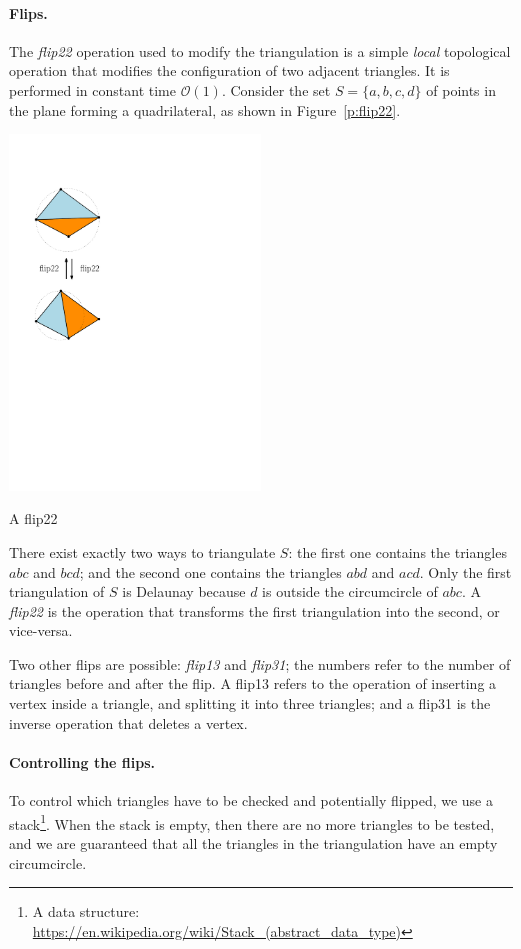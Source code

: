\paragraph{Flips.}
The \emph{flip22} operation used to modify the triangulation is a simple \emph{local} topological operation that modifies the configuration of two adjacent triangles. 
It is performed in constant time $\mathcal{O}(1)$.
Consider the set $S = \{a, b, c, d\}$ of points in the plane forming a quadrilateral, as shown in Figure~\ref{p:flip22}. 
\begin{marginfigure}
  \centering
  \includegraphics[width=0.5\textwidth]{figs/flip22}
  \caption{A flip22}%
\label{p:flip22}
\end{marginfigure}
There exist exactly two ways to triangulate $S$: the first one contains the triangles $abc$ and $bcd$; and the second one contains the triangles $abd$ and $acd$. 
Only the first triangulation of $S$ is Delaunay because $d$ is outside the circumcircle of $abc$. 
A \emph{flip22} is the operation that transforms the first triangulation into the second, or vice-versa.

Two other flips are possible: \emph{flip13} and \emph{flip31}; the numbers refer to the number of triangles before and after the flip.
A flip13 refers to the operation of inserting a vertex inside a triangle, and splitting it into three triangles; and a flip31 is the inverse operation that deletes a vertex.


\paragraph{Controlling the flips.}
To control which triangles have to be checked and potentially flipped, we use a stack\footnote{A data structure: \url{https://en.wikipedia.org/wiki/Stack_(abstract_data_type)}}. 
When the stack is empty, then there are no more triangles to be tested, and we are guaranteed that all the triangles in the triangulation have an empty circumcircle.


